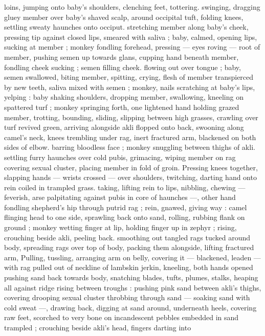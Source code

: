 loins, jumping onto baby's shoulders, clenching feet, tottering.
swinging, dragging gluey member over baby's shaved scalp, around
occipital tuft, folding knees, settling sweaty haunches onto occiput.
stretching member along baby's cheek, pressing tip against closed
lips, smeared with saliva ; baby, calmed, opening lips, sucking at
member ; monkey fondling forehead, pressing --- eyes roving ---
root of member, pushing semen up towards glans, cupping hand
beneath member, fondling cheek sucking ; semen filling cheek.
flowing out over tongue ; baby, semen swallowed, biting member,
spitting, crying, flesh of member transpierced by new teeth, saliva
mixed with semen ; monkey, nails scratching at baby's lips, yelping :
baby shaking shoulders, dropping member, swallowing, kneeling on
spattered turf ; monkey springing forth, one lightened hand holding
grazed member, trotting, bounding, sliding, slipping between high
grasses, crawling over turf revived green, arriving alongside akli
flopped onto back, swooning along camel's neck, knees trembling
under rag, inert fractured arm, blackened on both sides of elbow.
barring bloodless face ; monkey snuggling between thighs of akli.
settling furry haunches over cold pubis, grimacing, wiping member
on rag covering sexual cluster, placing member in fold of groin.
Pressing knees together, slapping hands --- wrists crossed --- over
shoulders, twitching, darting hand onto rein coiled in trampled grass.
taking, lifting rein to lips, nibbling, chewing --- feverish, arse
palpitating against pubis in core of haunches ---, other hand
fondling shepherd's hip through putrid rag ; rein, gnawed, giving way
: camel flinging head to one side, sprawling back onto sand, rolling,
rubbing flank on ground ; monkey wetting finger at lip, holding finger
up in zephyr ; rising, crouching beside akli, peeling back. smoothing
out tangled rags tucked around body, spreading rags over top of
body, packing them alongside, lifting fractured arm, Pulling, tussling,
arranging arm on belly, covering it --- blackened, leaden --- with rag
pulled out of neckline of lambskin jerkin, kneeling, both hands
opened pushing sand back towards body, snatching blades, tufts,
plumes, stalks, heaping all against ridge rising between troughs :
pushing pink sand between akli's thighs, covering drooping sexual
cluster throbbing through sand --- soaking sand with cold sweat ---,
drawing back, digging at sand around, underneath heels, covering
raw feet, scorched to very bone on incandescent pebbles embedded
in sand trampled ; crouching beside akli's head, fingers darting into
